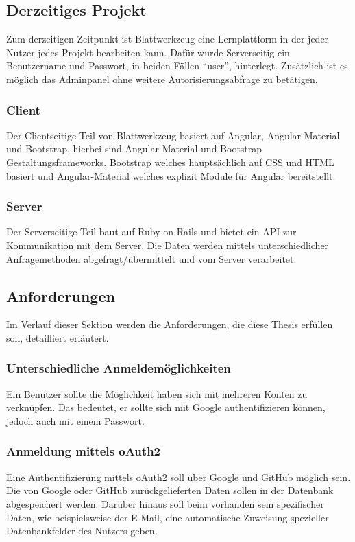 \documentclass[paper=a4,fontsize=12pt,parskip=half]{scrartcl}
\begin{document}
	\subsection{Derzeitiges Projekt}
	\label{sec: current_project}
	Zum derzeitigen Zeitpunkt ist Blattwerkzeug eine Lernplattform in der jeder Nutzer jedes Projekt bearbeiten kann. Dafür wurde Serverseitig ein Benutzername und Passwort, in beiden Fällen \enquote{user}, hinterlegt. Zusätzlich ist es möglich das Adminpanel ohne weitere Autorisierungsabfrage zu betätigen.

	\subsubsection{Client}
	Der Clientseitige-Teil von Blattwerkzeug basiert auf Angular, Angular-Material und Bootstrap, hierbei sind Angular-Material und Bootstrap Gestaltungsframeworks. Bootstrap welches hauptsächlich auf \gls{CSS} und \gls{HTML} basiert und Angular-Material welches explizit Module für Angular bereitstellt.

	\subsubsection{Server}
	Der Serverseitige-Teil baut auf Ruby on Rails und bietet ein \gls{API} zur Kommunikation mit dem Server. Die Daten werden mittels unterschiedlicher Anfragemethoden abgefragt/übermittelt und vom Server verarbeitet.

	\subsection{Anforderungen}
	\label{sec: requirement}
	Im Verlauf dieser Sektion werden die Anforderungen, die diese Thesis erfüllen soll, detailliert erläutert.

	\subsubsection{Unterschiedliche Anmeldemöglichkeiten}
	Ein Benutzer sollte die Möglichkeit haben sich mit mehreren Konten zu verknüpfen. Das bedeutet, er sollte sich mit Google authentifizieren können, jedoch auch mit einem Passwort.

	\subsubsection{Anmeldung mittels \gls{oAuth2}}
	Eine Authentifizierung mittels oAuth2 soll über Google und GitHub möglich sein. Die von Google oder GitHub zurückgelieferten Daten sollen in der Datenbank abgespeichert werden. Darüber hinaus soll beim vorhanden sein spezifischer Daten, wie beispielsweise der E-Mail, eine automatische Zuweisung spezieller Datenbankfelder des Nutzers geben.
\end{document}

